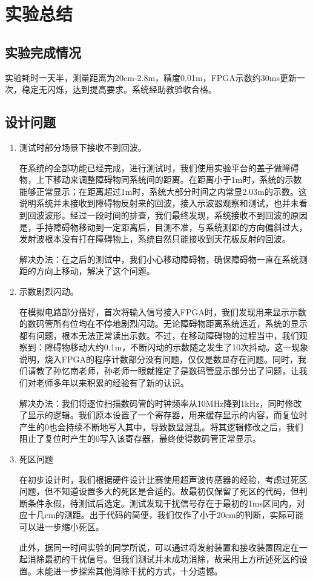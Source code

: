 \documentclass[a4paper, twocolumn]{ctexart}
\begin{document}
\section{实验总结}

\subsection{实验完成情况}

实验耗时一天半，测量距离为20cm-2.8m，精度0.01m，FPGA示数约30ms更新一次，稳定无闪烁，达到提高要求。系统经助教验收合格。

\subsection{设计问题}

\begin{enumerate}
    \item 测试时部分场景下接收不到回波。

          在系统的全部功能已经完成，进行测试时，我们使用实验平台的盖子做障碍物，上下移动来调整障碍物同系统间的距离。在距离小于1m时，系统的示数能够正常显示；在距离超过1m时，系统大部分时间之内常显2.03m的示数。这说明系统并未接收到障碍物反射来的回波，接入示波器观察和测试，也并未看到回波波形。经过一段时间的排查，我们最终发现，系统接收不到回波的原因是，手持障碍物移动到一定距离后，目测不准，与系统测距的方向偏斜过大，发射波根本没有打在障碍物上，系统自然只能接收到天花板反射的回波。

          解决办法：在之后的测试中，我们小心移动障碍物，确保障碍物一直在系统测距的方向上移动，解决了这个问题。

    \item 示数剧烈闪动。

          在模拟电路部分搭好，首次将输入信号接入FPGA时，我们发现用来显示示数的数码管所有位均在不停地剧烈闪动。无论障碍物距离系统远近，系统的显示都有问题，根本无法正常读出示数。不过，在移动障碍物的过程当中，我们观察到：障碍物移动大约0.1m，不断闪动的示数随之发生了10次抖动。这一现象说明，烧入FPGA的程序计数部分没有问题，仅仅是数显存在问题。同时，我们请教了孙忆南老师，孙老师一眼就推定了是数码管显示部分出了问题，让我们对老师多年以来积累的经验有了新的认识。

          解决办法：我们将逐位扫描数码管的时钟频率从10MHz降到1kHz，同时修改了显示的逻辑。我们原本设置了一个寄存器，用来缓存显示的内容，而复位时产生的0也会持续不断地写入其中，导致数显混乱。将其逻辑修改之后，我们阻止了复位时产生的0写入该寄存器，最终使得数码管正常显示。

    \item 死区问题

          在初步设计时，我们根据硬件设计比赛使用超声波传感器的经验，考虑过死区问题，但不知道设置多大的死区是合适的。故最初仅保留了死区的代码，但判断条件永假，待测试后选定。测试发现干扰信号存在于最初的1ms区间内，对应十几cm的测距。出于代码的简便，我们仅作了小于20cm的判断，实际可能可以进一步缩小死区。

          此外，据同一时间实验的同学所说，可以通过将发射装置和接收装置固定在一起消除最初的干扰信号。但我们测试并未成功消除，故采用上方所述死区的设置。未能进一步探索其他消除干扰的方式，十分遗憾。
\end{enumerate}
\end{document}
